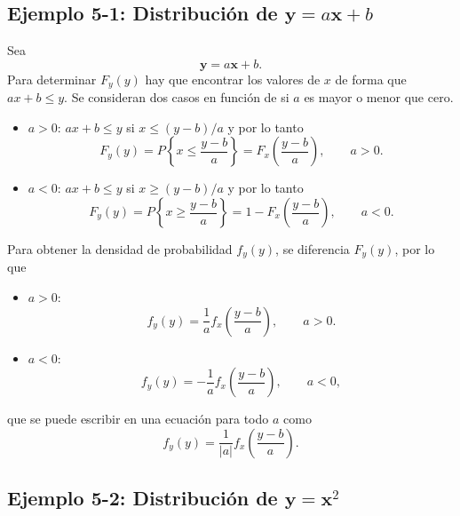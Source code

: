 \documentclass[a4paper]{report}
\newcommand{\x}{\mathbf{x}}
\newcommand{\y}{\mathbf{y}}
\begin{document}
\subsection{\texorpdfstring{Ejemplo 5-1: Distribución de \(\y=a\x+b\)}{}}\label{sec:y_equals_ax_plus_b_distribution}

Sea
\[
 \y=a\x+b.
\]
Para determinar \(F_y(y)\) hay que encontrar los valores de \(x\) de forma que \(ax+b\leq y\). Se consideran dos casos en función de si \(a\) es mayor o menor que cero.
\begin{itemize}
 \item \(a>0\): \(ax+b\leq y\) si \(x\leq(y-b)/a\) y por lo tanto
 \[
  F_y(y)=P\left\{x\leq\frac{y-b}{a}\right\}=F_x\left(\frac{y-b}{a}\right), \qquad a>0.
 \]
 \item \(a<0\): \(ax+b\leq y\) si \(x\geq(y-b)/a\) y por lo tanto
 \[
  F_y(y)=P\left\{x\geq\frac{y-b}{a}\right\}=1-F_x\left(\frac{y-b}{a}\right), \qquad a<0.
 \]
\end{itemize}
Para obtener la densidad de probabilidad \(f_y(y)\), se diferencia \(F_y(y)\), por lo que
\begin{itemize}
 \item \(a>0\): 
 \[
  f_y(y)=\frac{1}{a}f_x\left(\frac{y-b}{a}\right), \qquad a>0.
 \]
 \item \(a<0\): 
 \[
  f_y(y)=-\frac{1}{a}f_x\left(\frac{y-b}{a}\right), \qquad a<0,
 \]
\end{itemize}
que se puede escribir en una ecuación para todo \(a\) como
\begin{equation}\label{eq:y_equals_ax_plus_b_density}
 f_y(y)=\frac{1}{|a|}f_x\left(\frac{y-b}{a}\right).
\end{equation}

\subsection{\texorpdfstring{Ejemplo 5-2: Distribución de \(\y=\x^2\)}{}}\label{sec:x_square_distribution}
\end{document}
